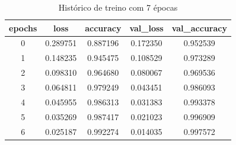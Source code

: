 

\begin{table}[h]
  \centering
  \caption{Histórico de treino com 7 épocas}
   \label{tab:history7}
\begin{tabular}{|c|c|c|c|c|} 
  \hline
   epochs & loss & accuracy & val\_loss & val\_accuracy \\
  \hline
0 & 0.289751 & 0.887196 & 0.172350 & 0.952539 \\
1 & 0.148235 & 0.945475 & 0.108529 & 0.973289 \\
2 & 0.098310 & 0.964680 & 0.080067 & 0.969536 \\
3 & 0.064811 & 0.979249 & 0.043451 & 0.986093 \\
4 & 0.045955 & 0.986313 & 0.031383 & 0.993378 \\
5 & 0.035269 & 0.987417 & 0.021023 & 0.996909 \\
6 & 0.025187 & 0.992274 & 0.014035 & 0.997572 \\
  \hline
\end{tabular}

\end{table}

